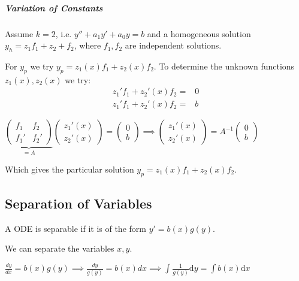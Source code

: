 \subparagraph{Variation of Constants}
Assume $k = 2$, i.e. $y'' + a_1y' + a_0y = b$ and a homogeneous solution $y_h = z_1 f_1 + z_2 + f_2$, where $f_1, f_2$ are independent solutions.

For $y_p$ we try $y_p = z_1(x) f_1 + z_2(x) f_2$. To determine the unknown functions $z_1(x), z_2(x)$ we try:
\begin{align*}
    z_1'f_1 + z_2'(x)f_2 =& 0\\ 
    z_1'f_1 + z_2'(x)f_2 =& b
\end{align*}

$
\underbrace{
\begin{pmatrix}
    f_1 & f_2\\
    f_1' & f_2'
\end{pmatrix}
}_{=A}
\begin{pmatrix}
    z_1'(x)\\
    z_2'(x)
\end{pmatrix}=
\begin{pmatrix}
    0\\
    b
\end{pmatrix}\implies
\begin{pmatrix}
    z_1'(x)\\
    z_2'(x)
\end{pmatrix}= 
A^{-1}
\begin{pmatrix}
    0\\
    b
\end{pmatrix}
$

Which gives the particular solution $y_p = z_1(x) f_1 + z_2(x) f_2$.

\subsection{Separation of Variables}
A ODE is separable if it is of the form $y' = b(x)g(y)$.

We can separate the variables $x, y$.

$\frac{dy}{dx} = b(x)g(y) \implies \frac{dy}{g(y)} = b(x)dx \implies \int \frac{1}{g(y)} \mathrm{d}y = \int b(x)\mathrm{d}x$
